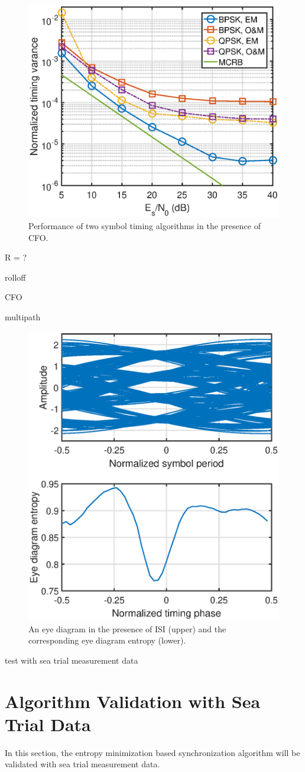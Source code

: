 \documentclass[journal,comsoc]{IEEEtran}
\begin{document}
\begin{figure}[ht]
\centering
\includegraphics[width=3 in]{pic/per_timing_frq.eps}
\caption{Performance of two symbol timing algorithms in the presence of CFO.}
\label{fig:timing_frq_per} 
\end{figure}  

R = ?


rolloff

CFO

multipath

\begin{figure}[ht]
\centering
\includegraphics[width=3 in]{pic/per_timing_multi.eps}
\caption{An eye diagram in the presence of ISI (upper) and the corresponding eye diagram entropy (lower).}
\label{fig:timing_frq_per} 
\end{figure} 

test with sea trial measurement data
\section{Algorithm Validation with Sea Trial Data }
\label{sec:validation}
In this section, the entropy minimization based synchronization algorithm will be validated with sea trial  measurement data. 
\end{document}
